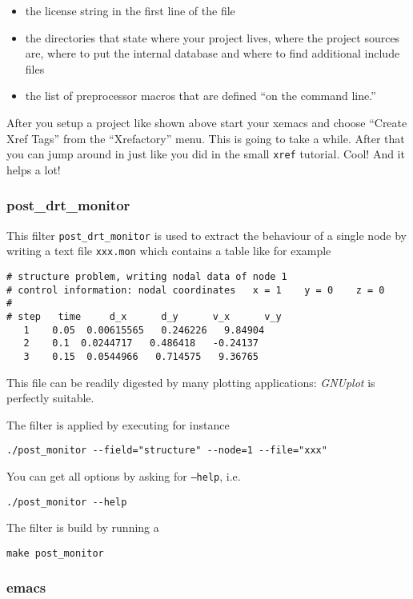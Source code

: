 \begin{itemize}
\item the license string in the first line of the file
\item the directories that state where your project lives, where the project
sources are, where to put the internal database and where to find
additional include files
\item the list of preprocessor macros that are defined {}``on the command
line.''
\end{itemize}
After you setup a project like shown above start your xemacs and choose
{}``Create Xref Tags'' from the {}``Xrefactory'' menu. This is
going to take a while. After that you can jump around in \ccarat{}
just like you did in the small \texttt{xref} tutorial. Cool! And it
helps a lot!

\subsubsection{post\_drt\_monitor}

This filter \texttt{post\_drt\_monitor} is used to extract the behaviour of a
single node by writing a
text file \texttt{xxx.mon} which contains a table like
for example
\begin{verbatim}
# structure problem, writing nodal data of node 1
# control information: nodal coordinates   x = 1    y = 0    z = 0
#
# step   time     d_x      d_y      v_x      v_y
   1    0.05  0.00615565   0.246226   9.84904
   2    0.1  0.0244717   0.486418   -0.24137
   3    0.15  0.0544966   0.714575   9.36765
\end{verbatim}
This file can be readily digested by many plotting applications:
\emph{GNUplot} is perfectly suitable.

The filter is applied by
executing for instance
\begin{verbatim}
./post_monitor --field="structure" --node=1 --file="xxx"
\end{verbatim}

You can get all options by asking for \texttt{--help}, i.e.\@
\begin{verbatim}
./post_monitor --help
\end{verbatim}


The filter is build by running a
\begin{verbatim}
make post_monitor
\end{verbatim}


\subsubsection{emacs}

